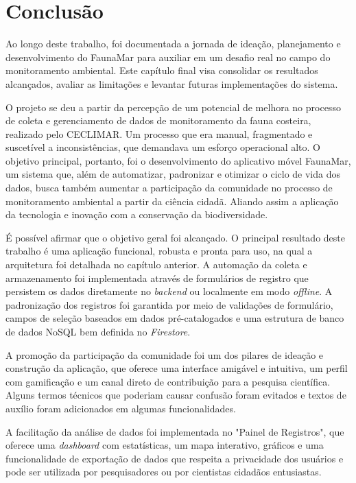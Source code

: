 \chapter{Conclusão}
\label{cap:conclusao}

Ao longo deste trabalho, foi documentada a jornada de ideação, planejamento e desenvolvimento do FaunaMar para auxiliar em um desafio real no campo do monitoramento ambiental. Este capítulo final visa consolidar os resultados alcançados, avaliar as limitações e levantar futuras implementações do sistema.

O projeto se deu a partir da percepção de um potencial de melhora no processo de coleta e gerenciamento de dados de monitoramento da fauna costeira, realizado pelo CECLIMAR. Um processo que era manual, fragmentado e suscetível a inconsistências, que demandava um esforço operacional alto. O objetivo principal, portanto, foi o desenvolvimento do aplicativo móvel FaunaMar, um sistema que, além de automatizar, padronizar e otimizar o ciclo de vida dos dados, busca também aumentar a participação da comunidade no processo de monitoramento ambiental a partir da ciência cidadã. Aliando assim a aplicação da tecnologia e inovação com a conservação da biodiversidade.

É possível afirmar que o objetivo geral foi alcançado. O principal resultado deste trabalho é uma aplicação funcional, robusta e pronta para uso, na qual a arquitetura foi detalhada no capítulo anterior. A automação da coleta e armazenamento foi implementada através de formulários de registro que persistem os dados diretamente no \textit{backend} ou localmente em modo \textit{offline}. A padronização dos registros foi garantida por meio de validações de formulário, campos de seleção baseados em dados pré-catalogados e uma estrutura de banco de dados NoSQL bem definida no \textit{Firestore}.

A promoção da participação da comunidade foi um dos pilares de ideação e construção da aplicação, que oferece uma interface amigável e intuitiva, um perfil com gamificação e um canal direto de contribuição para a pesquisa científica. Alguns termos técnicos que poderiam causar confusão foram evitados e textos de auxílio foram adicionados em algumas funcionalidades.

A facilitação da análise de dados foi implementada no "Painel de Registros", que oferece uma \textit{dashboard} com estatísticas, um mapa interativo, gráficos e uma funcionalidade de exportação de dados que respeita a privacidade dos usuários e pode ser utilizada por pesquisadores ou por cientistas cidadãos entusiastas.

